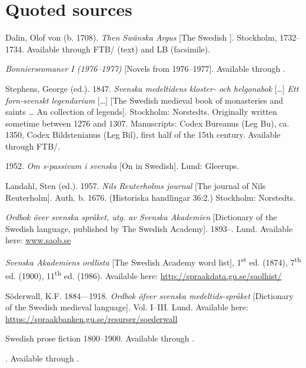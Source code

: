 \documentclass[output=paper]{langscibook}
\begin{document}
\section*{Quoted sources}
\begin{description}\sloppy
\item[\textit{Argus}:] Dalin, Olof von (b. 1708). \textit{Then Swänska Argus} [The Swedish ]. Stockholm, 1732–1734. Available through FTB/ (text) and LB (facsimile).
\item[Bonniers:] \textit{Bonniersromaner I (1976–1977)} [Novels from 1976–1977]. Available through .
\item[Leg:] Stephens, George (ed.). 1847. \textit{Svenska medeltidens kloster- och helgonabok} […] \textit{Ett forn-svenskt legendarium} […] [The Swedish medieval book of monasteries and saints … An  collection of legends]. Stockholm: Norstedts. Originally written sometime between 1276 and 1307. Manuscripts: Codex Bureanus (Leg Bu), ca. 1350, Codex Bildstenianus (Leg Bil), first half of the 15th century. Available through FTB/.
\item[\normalfont Holm, Gösta.] 1952. \textit{Om s-passivum i svenska} [On  in Swedish]. Lund: Gleerups.
\item[Reuterholm:] Landahl, Sten (ed.). 1957. \textit{Nils Reuterholms journal} [The journal of Nils Reuterholm]. Auth. b. 1676. (Historiska handlingar 36:2.) Stockholm: Norstedts.
\item[\isi{SAOB}:] \textit{Ordbok över svenska språket, utg. av Svenska Akademien} [Dictionary of the Swedish language, published by The Swedish Academy]. 1893–. Lund. Available here: \href{http://www.saob.se}{{www.saob.se}} 
\item[\isi{SAOL}:] \textit{Svenska Akademiens ordlista} [The Swedish Academy word list], 1\textsuperscript{st} ed. (1874), 7\textsuperscript{th} ed. (1900), 11\textsuperscript{th} ed. (1986). Available here: \url{http://spraakdata.gu.se/saolhist/}
\item[Sdw:] Söderwall, K.F. 1884—1918. \textit{Ordbok öfver svenska medeltids-språket} [Dictionary of the Swedish medieval language]. Vol. I–III. Lund. Available here: \url{https://spraakbanken.gu.se/resurser/soederwall} 
\item[SPF:] Swedish prose fiction 1800–1900. Available through . 
\item[\textit{Äldre svenska romaner}] [\ili{Older Swedish} novels]. Available through . 
\end{description}
\end{document}
